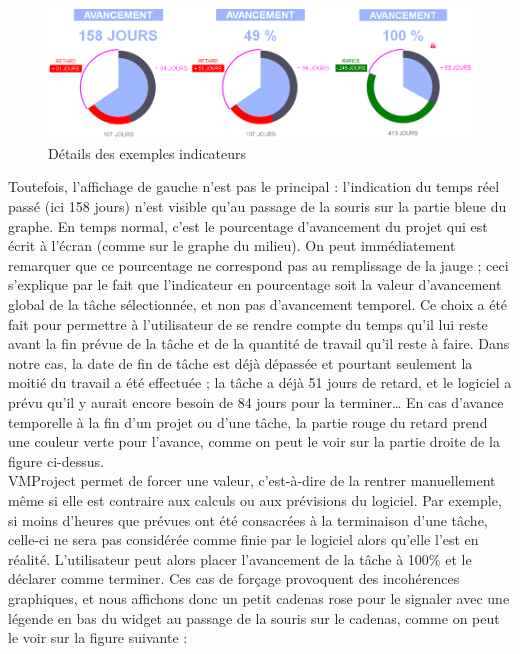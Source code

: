 \documentclass[12pt]{report}
\begin{document}
\begin{figure}[H]
	\centering
	\includegraphics[width=1\textwidth]{pictures/clement/c6.png}
	\caption{Détails des exemples indicateurs}
	\label{c6}
\end{figure}

Toutefois, l’affichage de gauche n’est pas le principal : l’indication du temps réel passé (ici 158 jours) n’est visible qu’au passage de la souris sur la partie bleue du graphe. En temps normal, c’est le pourcentage d’avancement du projet qui est écrit à l’écran (comme sur le graphe du milieu). On peut immédiatement remarquer que ce pourcentage ne correspond pas au remplissage de la jauge ; ceci s’explique par le fait que l’indicateur en pourcentage soit la valeur d’avancement global de la tâche sélectionnée, et non pas d’avancement temporel. Ce choix a été fait pour permettre à l’utilisateur de se rendre compte du temps qu’il lui reste avant la fin prévue de la tâche et de la quantité de travail qu’il reste à faire. Dans notre cas, la date de fin de tâche est déjà dépassée et pourtant seulement la moitié du travail a été effectuée ; la tâche a déjà 51 jours de retard, et le logiciel a prévu qu’il y aurait encore besoin de 84 jours pour la terminer…  En cas d’avance temporelle à la fin d’un projet ou d’une tâche, la partie rouge du retard prend une couleur verte pour l’avance, comme on peut le voir sur la partie droite de la figure ci-dessus.\\

VMProject permet de forcer une valeur, c’est-à-dire de la rentrer manuellement même si elle est contraire aux calculs ou aux prévisions du logiciel. Par exemple, si moins d’heures que prévues ont été consacrées à la terminaison d’une tâche, celle-ci ne sera pas considérée comme finie par le logiciel alors qu’elle l’est en réalité. L’utilisateur peut alors placer l’avancement de la tâche à 100\% et le déclarer comme terminer. Ces cas de forçage provoquent des incohérences graphiques, et nous affichons donc un petit cadenas rose pour le signaler avec une légende en bas du widget au passage de la souris sur le cadenas, comme on peut le voir sur la figure suivante :\\
\end{document}
